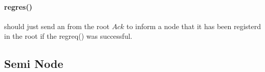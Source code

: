 \documentclass{article}
\begin{document}
\paragraph{reg\underline{\hspace{.05in}}res()} should just send an from the root $Ack$ to inform a node that it has been registerd in the root if the reg\underline{\hspace{.05in}}req() was successful.
\subsection{Semi Node}
\paragraph{}
\subsection{}
\paragraph{}
\clearpage
\end{document}
